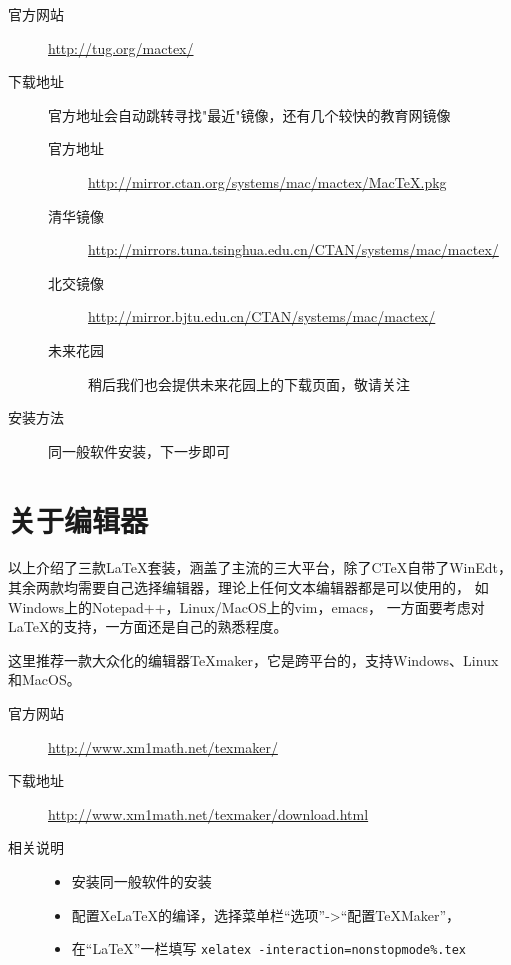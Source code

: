 \begin{description}
    \item[官方网站]
        \url{http://tug.org/mactex/}
    \item[下载地址] 官方地址会自动跳转寻找"最近"镜像，还有几个较快的教育网镜像
    \begin{description}
        \item[官方地址]
            \url{http://mirror.ctan.org/systems/mac/mactex/MacTeX.pkg}
        \item[清华镜像]
            \url{http://mirrors.tuna.tsinghua.edu.cn/CTAN/systems/mac/mactex/}
        \item[北交镜像]
            \url{http://mirror.bjtu.edu.cn/CTAN/systems/mac/mactex/}
        \item[未来花园]
            稍后我们也会提供未来花园上的下载页面，敬请关注
    \end{description}
    \item[安装方法] 同一般软件安装，下一步即可
\end{description}

\section{关于编辑器}

以上介绍了三款\LaTeX{}套装，涵盖了主流的三大平台，除了C\TeX{}自带了WinEdt，
其余两款均需要自己选择编辑器，理论上任何文本编辑器都是可以使用的，
如Windows上的Notepad++，Linux/MacOS上的vim，emacs，
一方面要考虑对\LaTeX{}的支持，一方面还是自己的熟悉程度。

这里推荐一款大众化的编辑器\TeX{}maker，它是跨平台的，支持Windows、Linux和MacOS。

\begin{description}
    \item[官方网站]
        \url{http://www.xm1math.net/texmaker/}
    \item[下载地址]
        \url{http://www.xm1math.net/texmaker/download.html}
    \item[相关说明]
    \begin{itemize}
        \item 安装同一般软件的安装
        \item 配置Xe\LaTeX{}的编译，选择菜单栏“选项”->“配置\TeX{}Maker”，
        \item[] 在“\LaTeX{}”一栏填写
            \texttt{xelatex -interaction=nonstopmode\%.tex}
    \end{itemize}
\end{description}

